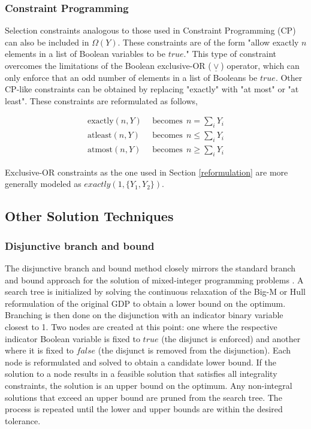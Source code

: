\documentclass{juliacon}
\begin{document}
\subsubsection{Constraint Programming}
Selection constraints analogous to those used in Constraint Programming (CP) can also be included in $\Omega(Y)$. These constraints are of the form "allow exactly $n$ elements in a list of Boolean variables to be $true$." This type of constraint overcomes the limitations of the Boolean exclusive-OR ($\underline{\vee}$) operator, which can only enforce that an odd number of elements in a list of Booleans be $true$. Other CP-like constraints can be obtained by replacing "exactly" with "at most" or "at least". These constraints are reformulated as follows,

\begin{align*}
    \text{exactly}(n, Y) & \ \ \text{becomes} \ \ n = \sum_i Y_i \\
    \text{atleast}(n, Y) &  \ \ \text{becomes} \ \ n \leq \sum_i Y_i \\
    \text{atmost}(n, Y) &  \ \ \text{becomes} \ \ n \geq \sum_i Y_i
\end{align*}

Exclusive-OR constraints as the one used in Section \ref{reformulation} are more generally modeled as $exactly(1,\{Y_1,Y_2\})$.

\subsection{Other Solution Techniques} \label{other_techniques}

\subsubsection{Disjunctive branch and bound}
The disjunctive branch and bound method closely mirrors the standard branch and bound approach for the solution of mixed-integer programming problems \cite{grossmann_lee_2003}. A search tree is initialized by solving the continuous relaxation of the Big-M or Hull reformulation of the original GDP to obtain a lower bound on the optimum. Branching is then done on the disjunction with an indicator binary variable closest to 1. Two nodes are created at this point: one where the respective indicator Boolean variable is fixed to $true$ (the disjunct is enforced) and another where it is fixed to $false$ (the disjunct is removed from the disjunction). Each node is reformulated and solved to obtain a candidate lower bound. If the solution to a node results in a feasible solution that satisfies all integrality constraints, the solution is an upper bound on the optimum. Any non-integral solutions that exceed an upper bound are pruned from the search tree. The process is repeated until the lower and upper bounds are within the desired tolerance.
\end{document}
